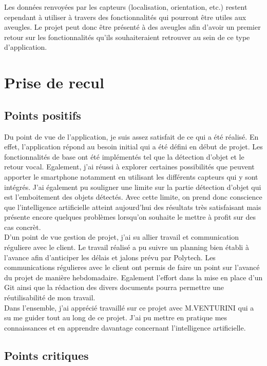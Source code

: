 \documentclass[UTF8]{EPURapport}
\begin{document}
Les données renvoyées par les capteurs (localisation, orientation, etc.) restent cependant à utiliser à travers des fonctionnalités qui pourront être utiles aux aveugles. Le projet peut donc être présenté à des aveugles afin d'avoir un premier retour sur les fonctionnalités qu'ils souhaiteraient retrouver au sein de ce type d'application.

\chapter{Prise de recul}

\section{Points positifs}

Du point de vue de l'application, je suis assez satisfait de ce qui a été réalisé. En effet, l'application répond au besoin initial qui a été défini en début de projet. Les fonctionnalités de base ont été implémentés tel que la détection d'objet et le retour vocal. Egalement, j'ai réussi à explorer certaines possibilités que peuvent apporter le smartphone notamment en utilisant les différents capteurs qui y sont intégrés. J'ai également pu souligner une limite sur la partie détection d'objet qui est l'emboitement des objets détectés. Avec cette limite, on prend donc conscience que l'intelligence artificielle atteint aujourd'hui des résultats très satisfaisant mais présente encore quelques problèmes lorsqu'on souhaite le mettre à profit sur des cas concrèt.\\

D'un point de vue gestion de projet, j'ai su allier travail et communication réguliere avec le client. Le travail réalisé a pu suivre un planning bien établi à l'avance afin d'anticiper les délais et jalons prévu par Polytech. Les communications régulieres avec le client ont permis de faire un point sur l'avancé du projet de manière hebdomadaire. Egalement l'effort dans la mise en place d'un Git ainsi que la rédaction des divers documents pourra permettre une réutilisabilité de mon travail.\\

Dans l'ensemble, j'ai apprécié travaillé sur ce projet avec M.VENTURINI qui a su me guider tout au long de ce projet. J'ai pu mettre en pratique mes connaissances et en apprendre davantage concernant l'intelligence artificielle.

\section{Points critiques}
\end{document}
